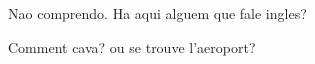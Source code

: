 \documentclass{article}
\begin{document}
Nao comprendo. Ha aqui alguem que fale ingles?

Comment cava? ou se trouve l'aeroport?
\end{document}
